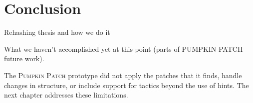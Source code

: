\section{Conclusion}

Rehashing thesis and how we do it

What we haven't accomplished yet at this point (parts of PUMPKIN PATCH future work).

The \textsc{Pumpkin Patch} prototype did not apply the patches that it finds,
handle changes in structure, or include support for tactics beyond the use of hints.
The next chapter addresses these limitations.


